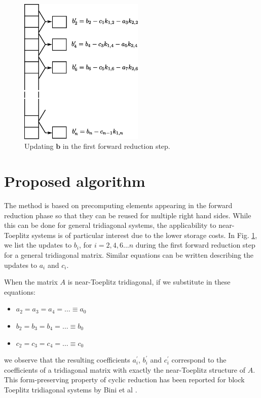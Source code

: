 \documentclass{elsarticle}
\begin{document}
\begin{figure}
\begin{center}
\includegraphics[height=200pt]{img/forward-reduction-step.eps}
\end{center}
\caption{Updating $\bm{b}$ in the first forward reduction step.}
\label{fig:forward-reduction-step}
\end{figure}

\section{Proposed algorithm} \label{sec:proposed-algorithm}

The method is based on precomputing elements 
appearing in the forward reduction phase
so that they can be reused for multiple right hand sides.
While this can be done for general tridiagonal systems,
the applicability to near-Toeplitz systems is
of particular interest due to the lower storage costs.
In Fig. \ref{fig:forward-reduction-step},
we list the updates to
$b_i$, for $i=2, 4, 6 ... n$
during the first forward reduction step
for a general tridiagonal matrix.
Similar equations can be written describing
the updates to $a_i$ and  $c_i$.

When the matrix $A$ is near-Toeplitz tridiagonal,
if we substitute in these equations:

\begin{itemize}
    \item [] $a_2 = a_3 = a_4 = \hdots \equiv a_0$
    \item [] $b_2 = b_3 = b_4 = \hdots \equiv b_0$
    \item [] $c_2 = c_3 = c_4 = \hdots \equiv c_0$
\end{itemize}
%
we observe that the resulting coefficients
$a_i^\prime$, $b_i^\prime$ and $c_i^\prime$
correspond to the coefficients of a tridiagonal matrix with
exactly the near-Toeplitz structure of $A$.
This form-preserving property of cyclic reduction
has been reported for block Toeplitz tridiagonal systems
by Bini et al \cite{bini}.
\end{document}
